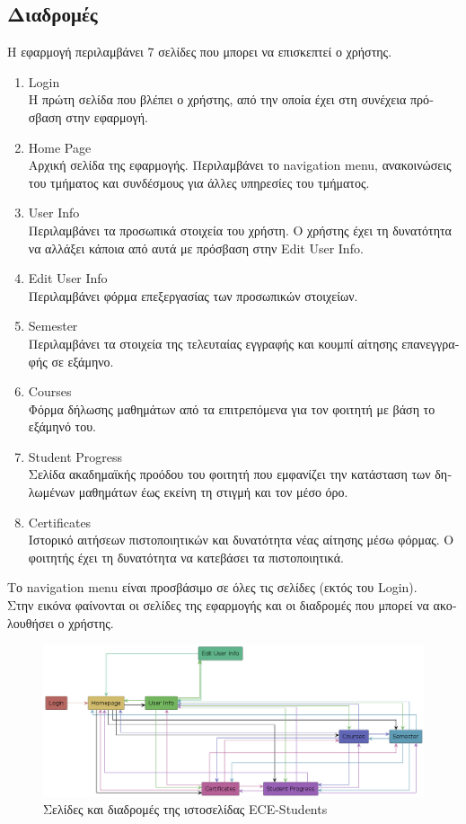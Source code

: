 \documentclass[manuscript,screen,review]{acmart}
\newcommand{\gr}[1]{\foreignlanguage{greek}{#1}}
\begin{document}
\subsection{\gr{Διαδρομές}}
\gr{Η εφαρμογή περιλαμβάνει 7 σελίδες που μπορει να επισκεπτεί ο χρήστης.}
\begin{enumerate}
    \item Login \\\gr{Η πρώτη σελίδα που βλέπει ο χρήστης, από την οποία έχει στη συνέχεια πρόσβαση στην εφαρμογή.}
    \item Home Page \\\gr{Αρχική σελίδα της εφαρμογής. Περιλαμβάνει το} navigation menu, \gr{ανακοινώσεις του τμήματος και συνδέσμους για άλλες υπηρεσίες του τμήματος.}
    \item User Info \\\gr{Περιλαμβάνει τα προσωπικά στοιχεία του χρήστη. Ο χρήστης έχει τη δυνατότητα να αλλάξει κάποια από αυτά με πρόσβαση στην} Edit User Info.
    \item Edit User Info \\\gr{Περιλαμβάνει φόρμα επεξεργασίας των προσωπικών στοιχείων.}
    \item Semester \\\gr{Περιλαμβάνει τα στοιχεία της τελευταίας εγγραφής και κουμπί αίτησης επανεγγραφής σε εξάμηνο.}
    \item Courses \\\gr{Φόρμα δήλωσης μαθημάτων από τα επιτρεπόμενα για τον φοιτητή με βάση το εξάμηνό του.}
    \item Student Progress \\\gr{Σελίδα ακαδημαϊκής προόδου του φοιτητή που εμφανίζει την κατάσταση των δηλωμένων μαθημάτων έως εκείνη τη στιγμή και τον μέσο όρο.}
    \item Certificates \\\gr{Ιστορικό αιτήσεων πιστοποιητικών και δυνατότητα νέας αίτησης μέσω φόρμας. Ο φοιτητής έχει τη δυνατότητα να κατεβάσει τα πιστοποιητικά.}
\end{enumerate}

\gr{Το} navigation menu \gr{είναι προσβάσιμο σε όλες τις σελίδες (εκτός του} Login).
\\\gr{Στην εικόνα φαίνονται οι σελίδες της εφαρμογής και οι διαδρομές που μπορεί να ακολουθήσει ο χρήστης.}

\begin{figure}[H]
    \centering
    \includegraphics[width=1.0\textwidth]{diagram.png}
    \caption{\gr{Σελίδες και διαδρομές της ιστοσελίδας} ECE-Students}
    \label{fig:enter-label}
\end{figure}
\end{document}
